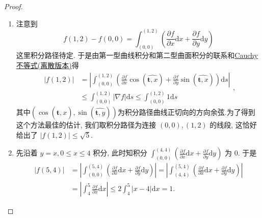 \documentclass[../../main.tex]{subfiles}
\begin{document}
\begin{proof}
\begin{enumerate}
\item 注意到
\[
f(1,2) - f(0,0) = \int_{(0,0)}^{(1,2)} \left( \frac{\partial f}{\partial x} \mathrm{d}x + \frac{\partial f}{\partial y} \mathrm{d}y \right)
\]
这里积分路径待定. 于是由第一型曲线积分和第二型曲面积分的联系和\hyperref[theorem:Cauchy不等式]{Cauchy不等式(离散版本)}得
\[
\begin{aligned}
|f(1,2)| &= \left| \int_{(0,0)}^{(1,2)} \left( \frac{\partial f}{\partial x} \cos \left( \widehat{\boldsymbol{t},x} \right)  + \frac{\partial f}{\partial y} \sin \left( \widehat{\boldsymbol{t},x} \right)  \right) \mathrm{d}s \right| \\
&\leqslant \int_{(0,0)}^{(1,2)} |\nabla f| \mathrm{d}s \leqslant \int_{(0,0)}^{(1,2)} 1 \mathrm{d}s
\end{aligned},
\]
其中$\left( \cos \left( \widehat{\boldsymbol{t},x} \right) ,\sin \left( \widehat{\boldsymbol{t},y} \right) \right) $为积分路径曲线正切向的方向余弦.为了得到这个方法最佳的估计, 我们取积分路径为连接 \( (0,0),(1,2) \) 的线段, 这恰好给出了 \( |f(1,2)| \leqslant \sqrt{5} \).

\item 先沿着 \( y = x, 0 \leqslant x \leqslant 4 \) 积分, 此时知积分 \( \int_{(0,0)}^{(4,4)} \left( \frac{\partial f}{\partial x} \mathrm{d}x + \frac{\partial f}{\partial y} \mathrm{d}y \right) \) 为 0. 于是
\[
\begin{aligned}
|f(5,4)| &= \left| \int_{(0,0)}^{(5,4)} \left( \frac{\partial f}{\partial x} \mathrm{d}x + \frac{\partial f}{\partial y} \mathrm{d}y \right) \right| = \left| \int_{(4,4)}^{(5,4)} \left( \frac{\partial f}{\partial x} \mathrm{d}x + \frac{\partial f}{\partial y} \mathrm{d}y \right) \right| \\
&= \left| \int_{4}^{5} \frac{\partial f}{\partial x} \mathrm{d}x \right| \leqslant 2 \int_{4}^{5} |x - 4| \mathrm{d}x = 1.
\end{aligned}
\]
\end{enumerate}

\end{proof}
\end{document}
